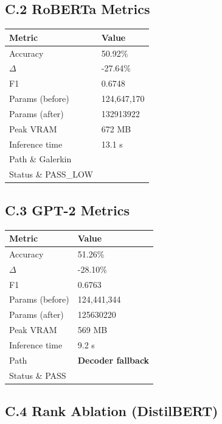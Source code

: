 \subsection{C.2 RoBERTa Metrics}

\begin{table}[H]
\centering
\small
\begin{tabular}{ll}
\toprule
\textbf{Metric} & \textbf{Value} \\
\midrule
Accuracy & 50.92\% \\
$\Delta$ & -27.64\% \\
F1 & 0.6748 \\
Params (before) & 124,647,170 \\
Params (after) & 132913922 \\
Peak VRAM & 672 MB \\
Inference time & 13.1 s \\
Path \& Galerkin \\
Status \& PASS\_LOW \\
\bottomrule
\end{tabular}
\end{table}

\subsection{C.3 GPT-2 Metrics}

\begin{table}[H]
\centering
\small
\begin{tabular}{ll}
\toprule
\textbf{Metric} & \textbf{Value} \\
\midrule
Accuracy & 51.26\% \\
$\Delta$ & -28.10\% \\
F1 & 0.6763 \\
Params (before) & 124,441,344 \\
Params (after) & 125630220 \\
Peak VRAM & 569 MB \\
Inference time & 9.2 s \\
Path & \textbf{Decoder fallback} \\
Status \& PASS \\
\bottomrule
\end{tabular}
\end{table}

\subsection{C.4 Rank Ablation (DistilBERT)}

